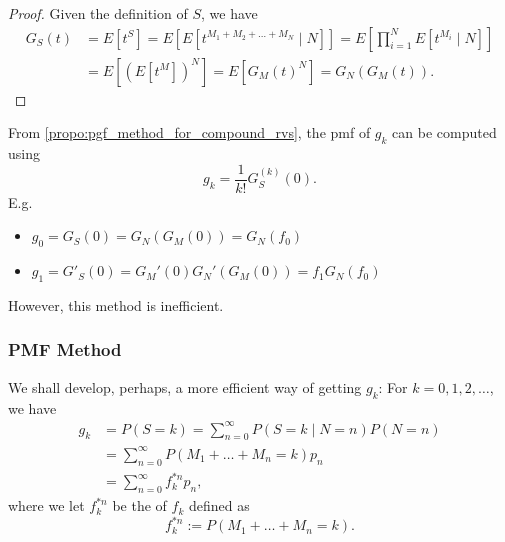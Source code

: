 \documentclass[notoc,notitlepage]{tufte-book}
\begin{document}
\begin{proof}
  Given the definition of $S$, we have
  \begin{align*}
    G_S(t) &= E \left[ t^S \right] = E \left[ E \left[ t^{M_1 + M_2 + \hdots + M_N} \mid N \right] \right] = E \left[ \prod_{i=1}^{N} E \left[ t^{M_i} \mid N \right] \right] \\
           &= E \left[ \left( E \left[ t^M \right] \right)^N \right] = E \left[ G_M(t)^N \right] = G_N( G_M(t) ).
  \end{align*}
\end{proof}

\begin{note}
  From \cref{propo:pgf_method_for_compound_rvs}, the pmf of $g_k$ can be computed using
    \begin{equation*}
      g_k = \frac{1}{k!}G_S^{(k)}(0).
    \end{equation*}
  E.g.
    \begin{itemize}
      \item $g_0 = G_S(0) = G_N(G_M(0)) = G_N(f_0)$
      \item $g_1 = G'_S(0) = G_M'(0) G_N'( G_M(0) ) = f_1 G_N(f_0)$
    \end{itemize}
  However, this method is inefficient.
\end{note}


\subsubsection{PMF Method}%
\label{ssub:pmf_method}

We shall develop, perhaps, a more efficient way of getting $g_k$: For $k = 0, 1, 2, \ldots$, we have
\begin{align*}
  g_k &= P(S = k) = \sum_{n=0}^{\infty} P(S = k \mid N = n) P(N = n) \\
      &= \sum_{n = 0}^{\infty} P ( M_1 + \hdots + M_n = k ) p_n \\
      &= \sum_{n=0}^{\infty} f_k^{*n} p_n,
\end{align*}
where we let $f_k^{*n}$ be the  of $f_k$ defined as
\begin{equation*}
  f_k^{*n} := P( M_1 + \hdots + M_n = k ).
\end{equation*}
\end{document}
